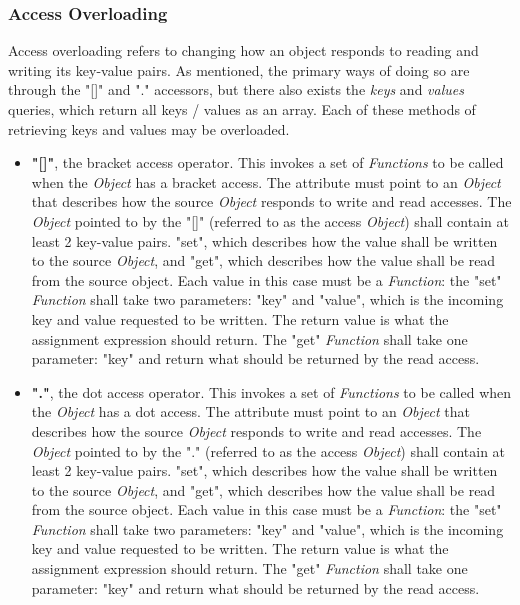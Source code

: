 \documentclass[12pt,letterpaper]{report}
\begin{document}
\subsubsection{Access Overloading}\label{Access Overloading}

Access overloading refers to changing how an object responds to reading and writing 
its key-value pairs. As mentioned, the primary ways of doing so are through the 
"[]" and "." accessors, but there also exists the \textit{keys} and \textit{values}
queries, which return all keys / values as an array. Each of these methods of retrieving
keys and values may be overloaded.

\begin{itemize}
  \item \textbf{"[]"}, the bracket access operator. This invokes a set of \textit{Functions} to be called when 
  the \textit{Object} has a bracket access. The attribute must point to an \textit{Object} that 
  describes how the source \textit{Object} responds to write and read accesses. The \textit{Object} pointed to 
  by the "[]" (referred to as the access \textit{Object}) shall contain at least 2 key-value pairs.
  "set", which describes how the value shall be written to the source \textit{Object}, and "get",
  which describes how the value shall be read from the source object. Each value in this case 
  must be a \textit{Function}: the "set" \textit{Function} shall take two parameters: "key" and "value", which 
  is the incoming key and value requested to be written. The return value is what the assignment expression should return. 
  The "get" \textit{Function} shall take one parameter: "key" and return what should be returned by the read access.
  


  \item \textbf{"."}, the dot access operator. This invokes a set of \textit{Functions} to be called when 
  the \textit{Object} has a dot access. The attribute must point to an \textit{Object} that 
  describes how the source \textit{Object} responds to write and read accesses. The \textit{Object} pointed to 
  by the "." (referred to as the access \textit{Object}) shall contain at least 2 key-value pairs.
  "set", which describes how the value shall be written to the source \textit{Object}, and "get",
  which describes how the value shall be read from the source object. Each value in this case 
  must be a \textit{Function}: the "set" \textit{Function} shall take two parameters: "key" and "value", which 
  is the incoming key and value requested to be written. The return value is what the assignment expression should return. 
  The "get" \textit{Function} shall take one parameter: "key" and return what should be returned by the read access.


\end{itemize}
\end{document}
